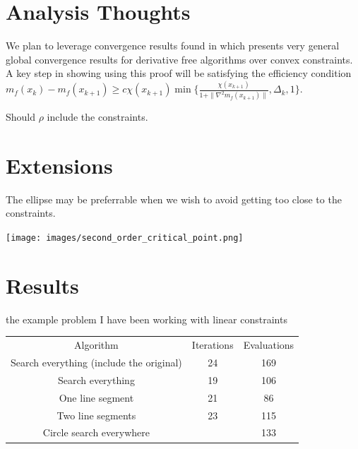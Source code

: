 \documentclass{article}
\begin{document}
\section{Analysis Thoughts}

We plan to leverage convergence results found in \cite{Conejo:2013:GCT:2620806.2621814} which presents very general global convergence results for derivative free algorithms over convex constraints.
A key step in showing using this proof will be satisfying the efficiency condition
$m_f(x_{k}) - m_f(x_{k+1}) \ge c \chi(x_{k+1}) \min\{ \frac{\chi(x_{k+1})}{1 + \|\nabla^2m_f(x_{k+1})\|}, \Delta_k, 1 \}$.

Should $\rho$ include the constraints.

\section{Extensions}
The ellipse may be preferrable when we wish to avoid getting too close to the constraints.



\texttt{[image: images/second\_order\_critical\_point.png]}


\section{Results}

the example problem I have been working with
    linear constraints
%





\begin{center}
\begin{tabular}{ c c c }
 Algorithm & Iterations & Evaluations \\ 
 Search everything (include the original) & 24 & 169 \\  
 Search everything & 19 & 106    \\
 One line segment & 21 & 86 \\
 Two line segments & 23 & 115 \\
 Circle search everywhere &  & 133 \\
\end{tabular}
\end{center}

\newpage

\newpage



\end{document}
